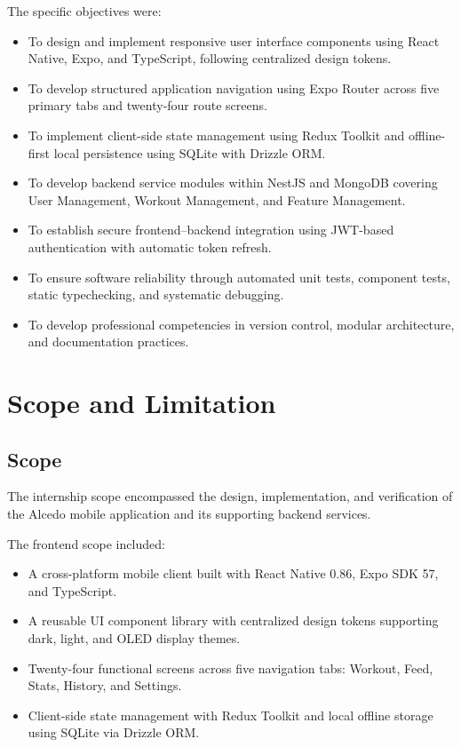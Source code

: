 The specific objectives were:
\begin{itemize}
    \item To design and implement responsive user interface components using React Native, Expo, and TypeScript, following centralized design tokens.
    \item To develop structured application navigation using Expo Router across five primary tabs and twenty-four route screens.
    \item To implement client-side state management using Redux Toolkit and offline-first local persistence using SQLite with Drizzle ORM.
    \item To develop backend service modules within NestJS and MongoDB covering User Management, Workout Management, and Feature Management.
    \item To establish secure frontend--backend integration using JWT-based authentication with automatic token refresh.
    \item To ensure software reliability through automated unit tests, component tests, static typechecking, and systematic debugging.
    \item To develop professional competencies in version control, modular architecture, and documentation practices.
\end{itemize}

\section{Scope and Limitation}

\subsection{Scope}
The internship scope encompassed the design, implementation, and verification of the Alcedo mobile application and its supporting backend services.

The frontend scope included:
\begin{itemize}
    \item A cross-platform mobile client built with React Native 0.86, Expo SDK 57, and TypeScript.
    \item A reusable UI component library with centralized design tokens supporting dark, light, and OLED display themes.
    \item Twenty-four functional screens across five navigation tabs: Workout, Feed, Stats, History, and Settings.
    \item Client-side state management with Redux Toolkit and local offline storage using SQLite via Drizzle ORM.
\end{itemize}

